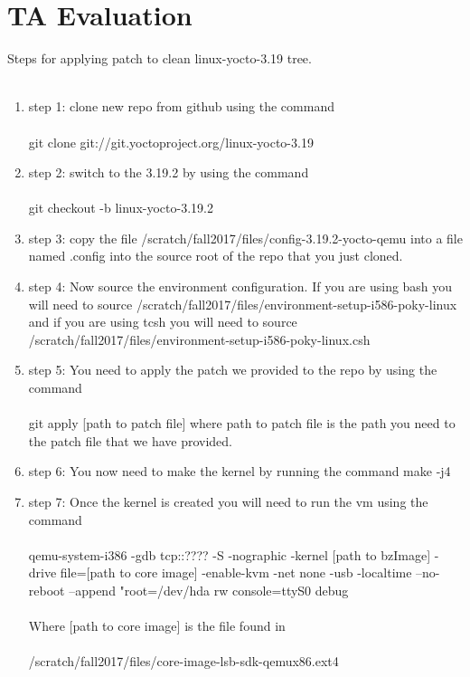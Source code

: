 \documentclass[letterpaper,10pt,titlepage]{article}
\begin{document}
\section{TA Evaluation}
Steps for applying patch to clean linux-yocto-3.19 tree.\\\\
\begin{enumerate}
\item{step 1: }
   clone new repo from github using the command\\\\
   git clone git://git.yoctoproject.org/linux-yocto-3.19
\item{step 2: }
   switch to the 3.19.2 by using the command\\\\
   git checkout -b linux-yocto-3.19.2
\item{step 3: }
   copy the file /scratch/fall2017/files/config-3.19.2-yocto-qemu into a file 
   named .config into the source root of the repo that you just cloned.
\item{step 4: }
   Now source the environment configuration. If you are using bash you will 
   need to source /scratch/fall2017/files/environment-setup-i586-poky-linux 
   and if you are using tcsh you will need  to source 
   /scratch/fall2017/files/environment-setup-i586-poky-linux.csh
\item{step 5: }
   You need to apply the patch we provided to the repo by using the command\\\\
   git apply [path to patch file] where path to patch file is the path you need 
   to the patch file that we have provided.
\item{step 6: }
   You now need to make the kernel by running the command make -j4 
\item{step 7: }
   Once the kernel is created you will need to run the vm using the command\\\\
   qemu-system-i386 -gdb tcp::???? -S -nographic -kernel [path to bzImage] -drive file=[path to core image] -enable-kvm -net none -usb -localtime --no-reboot --append "root=/dev/hda rw console=ttyS0 debug\\\\
   Where [path to core image] is the file found in\\\\ 
   /scratch/fall2017/files/core-image-lsb-sdk-qemux86.ext4\\\\

\end{enumerate}
\end{document}
